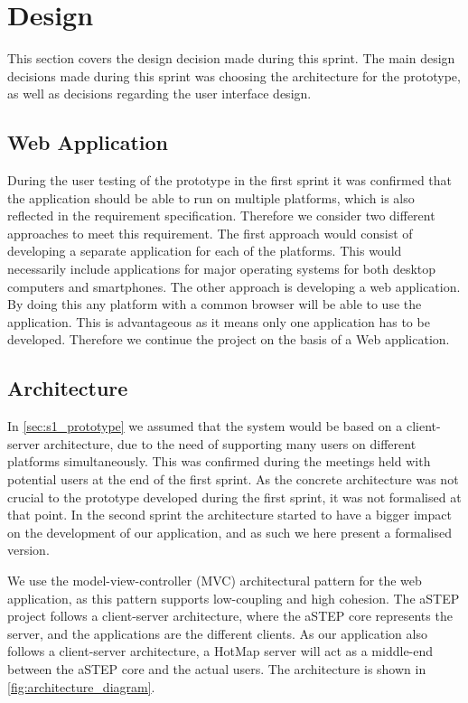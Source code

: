 \section{Design} \label{sec:s2_design}
This section covers the design decision made during this sprint. The main design decisions made during this sprint was choosing the architecture for the prototype, as well as decisions regarding the user interface design.

\subsection{Web Application}
During the user testing of the prototype in the first sprint it was confirmed that the application should be able to run on multiple platforms, which is also reflected in the requirement specification. Therefore we consider two different approaches to meet this requirement. The first approach would consist of developing a separate application for each of the platforms. This would necessarily include applications for major operating systems for both desktop computers and smartphones. The other approach is developing a web application. By doing this any platform with a common browser will be able to use the application. This is advantageous as it means only one application has to be developed. Therefore we continue the project on the basis of a Web application. 

\subsection{Architecture} \label{sec:s2_architecture}
In \cref{sec:s1_prototype} we assumed that the system would be based on a client-server architecture, due to the need of supporting many users on different platforms simultaneously. This was confirmed during the meetings held with potential users at the end of the first sprint. As the concrete architecture was not crucial to the prototype developed during the first sprint, it was not formalised at that point. In the second sprint the architecture started to have a bigger impact on the development of our application, and as such we here present a formalised version.

We use the model-view-controller (MVC)\cite{} architectural pattern for the web application, as this pattern supports low-coupling and high cohesion. The aSTEP project follows a client-server architecture, where the aSTEP core represents the server, and the applications are the different clients. As our application also follows a client-server architecture, a HotMap server will act as a middle-end between the aSTEP core and the actual users. The architecture is shown in \cref{fig:architecture_diagram}.

